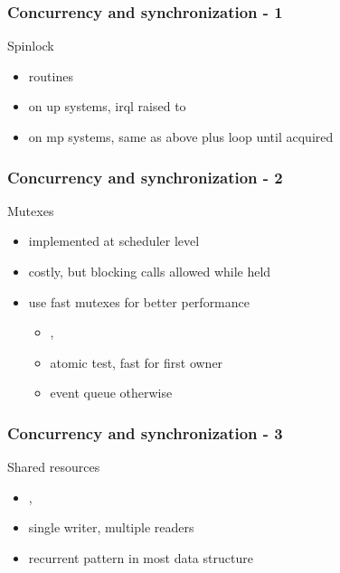 
\begin{frame}
 \frametitle{Concurrency and synchronization - 1}

 Spinlock

 \begin{itemize}
  \item {} routines
  \item on up systems, irql raised to 
  \item on mp systems, same as above plus loop until acquired
 \end{itemize}

\end{frame}


\begin{frame}
 \frametitle{Concurrency and synchronization - 2}

 Mutexes

 \begin{itemize}
  \item implemented at scheduler level
  \item costly, but blocking calls allowed while held
  \item use fast mutexes for better performance
  \begin{itemize}
   \item {}, 
   \item atomic test, fast for first owner
   \item event queue otherwise
  \end{itemize}
 \end{itemize}

\end{frame}


\begin{frame}
 \frametitle{Concurrency and synchronization - 3}

 Shared resources

 \begin{itemize}
  \item {}, 
  \item single writer, multiple readers
  \item recurrent pattern in most data structure
 \end{itemize}

\end{frame}

